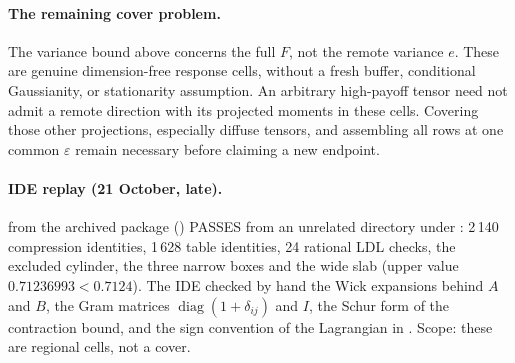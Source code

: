 \paragraph{The remaining cover problem.}
The variance bound above concerns the full $F$, not the remote variance
$e$. These are genuine dimension-free response cells, without a fresh
buffer, conditional Gaussianity, or stationarity assumption. An arbitrary
high-payoff tensor need not admit a remote direction with its projected
moments in these cells. Covering those other projections, especially
diffuse tensors, and assembling all rows at one common $\varepsilon$
remain necessary before claiming a new endpoint.

\paragraph{IDE replay (21 October, late).}  from the archived package
() PASSES from an unrelated directory under :
2\,140 compression identities, 1\,628 table identities, 24 rational LDL checks, the excluded cylinder, the three narrow boxes and the wide slab
(upper value $0.71236993<0.7124$). The IDE checked by hand the Wick expansions behind $A$ and $B$, the Gram matrices
$\operatorname{diag}(1+\delta_{ij})$ and $I$, the Schur form of the contraction bound, and the sign convention of the Lagrangian in
. Scope: these are regional cells, not a cover.
